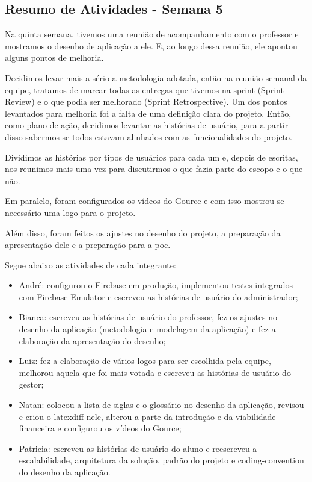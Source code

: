 \documentclass[
    12pt,               %
    openright,          %
    oneside,
    a4paper,            %
    english,            %
    brazil              %
    ]{ifsp-spo-inf-ctds} %
\begin{document}
\begin{apendicesenv}
\section{Resumo de Atividades - Semana 5}
Na quinta semana, tivemos uma reunião de acompanhamento com o professor e mostramos o desenho de aplicação a ele. E, ao longo dessa reunião, ele apontou alguns pontos de melhoria.

Decidimos levar mais a sério a metodologia adotada, então na reunião semanal da equipe, tratamos de marcar todas as entregas que tivemos na \gls{sprint} (Sprint Review) e o que podia ser melhorado (Sprint Retrospective). Um dos pontos levantados para melhoria foi a falta de uma definição clara do projeto. Então, como plano de ação, decidimos levantar as histórias de usuário, para a partir disso sabermos se todos estavam alinhados com as funcionalidades do projeto. 

Dividimos as histórias por tipos de usuários para cada um e, depois de escritas, nos reunimos mais uma vez para discutirmos o que fazia parte do escopo e o que não.

Em paralelo, foram configurados os vídeos do Gource e com isso mostrou-se necessário uma logo para o projeto.

Além disso, foram feitos os ajustes no desenho do projeto, a preparação da apresentação dele e a preparação para a \ac{poc}.

Segue abaixo as atividades de cada integrante:

\begin{itemize}
\item André: configurou o Firebase em produção, implementou testes integrados com Firebase Emulator e escreveu as histórias de usuário do administrador;
\item Bianca: escreveu as histórias de usuário do professor, fez os ajustes no desenho da aplicação (metodologia e modelagem da aplicação) e fez a elaboração da apresentação do desenho;
\item Luiz: fez a elaboração de vários logos para ser escolhida pela equipe, melhorou aquela que foi mais votada e escreveu as histórias de usuário do gestor;
\item Natan: colocou a lista de siglas e o glossário no desenho da aplicação, revisou e criou o latexdiff nele, alterou a parte da introdução e da viabilidade financeira e configurou os vídeos do Gource;
\item Patricia: escreveu as histórias de usuário do aluno e reescreveu a escalabilidade, arquitetura da solução, padrão do projeto e \gls{coding-convention} do desenho da aplicação.
\end{itemize}


\end{apendicesenv}
\end{document}
